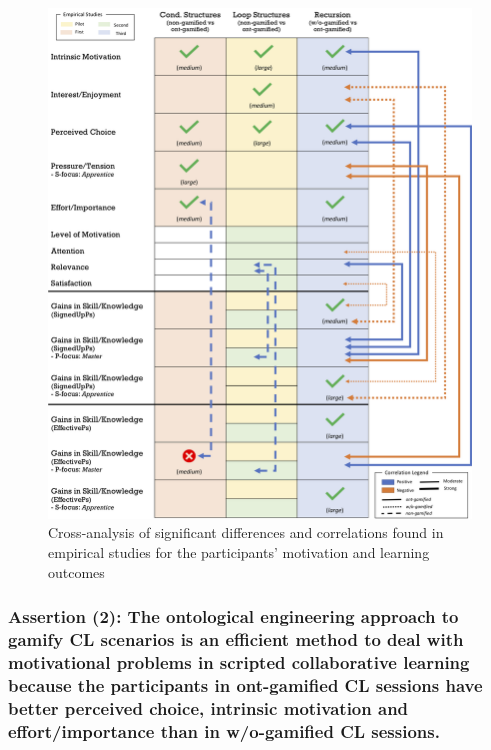 \begin{figure}[htb]
 \caption{Cross-analysis of significant differences and correlations found in empirical studies for the participants' motivation and learning outcomes}
 \label{fig:cross-analysis}
 \centering
 \includegraphics[width=1\textwidth]{images/chap-evaluation/cross-analysis.png}
 \fautor
\end{figure}

\subsubsection*{Assertion (2): The ontological engineering approach to gamify CL scenarios is an efficient method to deal with motivational problems in scripted collaborative learning because the participants in ont-gamified CL sessions have better perceived choice, intrinsic motivation and effort/importance than in w/o-gamified CL sessions.}

